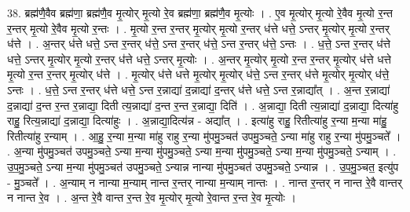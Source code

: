 \documentclass[17pt]{extarticle}
\begin{document}
38. ब्रह्म॑णै॒वैव ब्रह्म॑णा॒ ब्रह्म॑णै॒व मृ॒त्योर् मृ॒त्यो रे॒व ब्रह्म॑णा॒ ब्रह्म॑णै॒व मृ॒त्योः । . ए॒व मृ॒त्योर् मृ॒त्यो रे॒वैव मृ॒त्यो र॒न्त र॒न्तर् मृ॒त्यो रे॒वैव मृ॒त्यो र॒न्तः । . मृ॒त्यो र॒न्त र॒न्तर् मृ॒त्योर् मृ॒त्यो र॒न्तर् ध॑त्ते धत्ते॒ ऽन्तर् मृ॒त्योर् मृ॒त्यो र॒न्तर् ध॑त्ते । . अ॒न्तर् ध॑त्ते धत्ते॒ ऽन्त र॒न्तर् ध॑त्ते॒ ऽन्त र॒न्तर् ध॑त्ते॒ ऽन्त र॒न्तर् ध॑त्ते॒ ऽन्तः । . ध॒त्ते॒ ऽन्त र॒न्तर् ध॑त्ते धत्ते॒ ऽन्तर् मृ॒त्योर् मृ॒त्यो र॒न्तर् ध॑त्ते धत्ते॒ ऽन्तर् मृ॒त्योः । . अ॒न्तर् मृ॒त्योर् मृ॒त्यो र॒न्त र॒न्तर् मृ॒त्योर् ध॑त्ते धत्ते मृ॒त्यो र॒न्त र॒न्तर् मृ॒त्योर् ध॑त्ते । . मृ॒त्योर् ध॑त्ते धत्ते मृ॒त्योर् मृ॒त्योर् ध॑त्ते॒ ऽन्त र॒न्तर् ध॑त्ते मृ॒त्योर् मृ॒त्योर् ध॑त्ते॒ ऽन्तः । . ध॒त्ते॒ ऽन्त र॒न्तर् ध॑त्ते धत्ते॒ ऽन्त र॒न्नाद्या॑ द॒न्नाद्या॑ द॒न्तर् ध॑त्ते धत्ते॒ ऽन्त र॒न्नाद्या᳚त् । . अ॒न्त र॒न्नाद्या॑ द॒न्नाद्या॑ द॒न्त र॒न्त र॒न्नाद्या॒ दिती त्य॒न्नाद्या॑ द॒न्त र॒न्त र॒न्नाद्या॒ दिति॑ । . अ॒न्नाद्या॒ दिती त्य॒न्नाद्या॑ द॒न्नाद्या॒ दित्या॑हु राहु॒ रित्य॒न्नाद्या॑ द॒न्नाद्या॒ दित्या॑हुः । . अ॒न्नाद्या॒दित्य॑न्न - अद्या᳚त् । . इत्या॑हु राहु॒ रितीत्या॑हु र॒न्या म॒न्या मा॑हु॒ रितीत्या॑हु र॒न्याम् । . आ॒हु॒ र॒न्या म॒न्या मा॑हु राहु र॒न्या मु॑पमु॒ञ्चत॑ उपमु॒ञ्चते॒ ऽन्या मा॑हु राहु र॒न्या मु॑पमु॒ञ्चते᳚ । . अ॒न्या मु॑पमु॒ञ्चत॑ उपमु॒ञ्चते॒ ऽन्या म॒न्या मु॑पमु॒ञ्चते॒ ऽन्या म॒न्या मु॑पमु॒ञ्चते॒ ऽन्या म॒न्या मु॑पमु॒ञ्चते॒ ऽन्याम् । . उ॒प॒मु॒ञ्चते॒ ऽन्या म॒न्या मु॑पमु॒ञ्चत॑ उपमु॒ञ्चते॒ ऽन्यान्न नान्या मु॑पमु॒ञ्चत॑ उपमु॒ञ्चते॒ ऽन्यान्न । . उ॒प॒मु॒ञ्चत॒ इत्यु॑प - मु॒ञ्चते᳚ । . अ॒न्याम् न नान्या म॒न्याम् नान्त र॒न्तर् नान्या म॒न्याम् नान्तः । . नान्त र॒न्तर् न नान्त रे॒वै वान्तर् न नान्त रे॒व । . अ॒न्त रे॒वै वान्त र॒न्त रे॒व मृ॒त्योर् मृ॒त्यो रे॒वान्त र॒न्त रे॒व मृ॒त्योः । \newline
\pagebreak
{}
\end{document}
